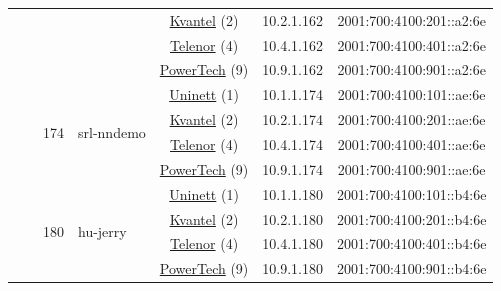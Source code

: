 \begin{small}
\begin{center}
\begin{longtable}{|c|c|c|c|c|c|c|c|}
  &  &  &  & \multicolumn{2}{|c|}{\tiny{\href{http://kvantel.no}{Kvantel} (2)}} & \tiny{10.2.1.162} & \tiny{2001:700:4100:201::a2:6e} \\* \cline{5-5}\cline{6-6}\cline{7-7}\cline{8-8}
  &  &  &  & \multicolumn{2}{|c|}{\tiny{\href{https://www.telenor.no}{Telenor} (4)}} & \tiny{10.4.1.162} & \tiny{2001:700:4100:401::a2:6e} \\* \cline{5-5}\cline{6-6}\cline{7-7}\cline{8-8}
  &  &  &  & \multicolumn{2}{|c|}{\tiny{\href{http://www.powertech.no}{PowerTech} (9)}} & \tiny{10.9.1.162} & \tiny{2001:700:4100:901::a2:6e} \\* \cline{3-3}\cline{4-4}\cline{5-5}\cline{6-6}\cline{7-7}\cline{8-8}
  &  & \multirow{4}{*}{\tiny{174}} & \multicolumn{1}{|l|}{\multirow{4}{*}{\tiny{srl-nndemo}}} & \multicolumn{2}{|c|}{\tiny{\href{https://www.uninett.no}{Uninett} (1)}} & \tiny{10.1.1.174} & \tiny{2001:700:4100:101::ae:6e} \\* \cline{5-5}\cline{6-6}\cline{7-7}\cline{8-8}
  &  &  &  & \multicolumn{2}{|c|}{\tiny{\href{http://kvantel.no}{Kvantel} (2)}} & \tiny{10.2.1.174} & \tiny{2001:700:4100:201::ae:6e} \\* \cline{5-5}\cline{6-6}\cline{7-7}\cline{8-8}
  &  &  &  & \multicolumn{2}{|c|}{\tiny{\href{https://www.telenor.no}{Telenor} (4)}} & \tiny{10.4.1.174} & \tiny{2001:700:4100:401::ae:6e} \\* \cline{5-5}\cline{6-6}\cline{7-7}\cline{8-8}
  &  &  &  & \multicolumn{2}{|c|}{\tiny{\href{http://www.powertech.no}{PowerTech} (9)}} & \tiny{10.9.1.174} & \tiny{2001:700:4100:901::ae:6e} \\* \cline{3-3}\cline{4-4}\cline{5-5}\cline{6-6}\cline{7-7}\cline{8-8}
  &  & \multirow{4}{*}{\tiny{180}} & \multicolumn{1}{|l|}{\multirow{4}{*}{\tiny{hu-jerry}}} & \multicolumn{2}{|c|}{\tiny{\href{https://www.uninett.no}{Uninett} (1)}} & \tiny{10.1.1.180} & \tiny{2001:700:4100:101::b4:6e} \\* \cline{5-5}\cline{6-6}\cline{7-7}\cline{8-8}
  &  &  &  & \multicolumn{2}{|c|}{\tiny{\href{http://kvantel.no}{Kvantel} (2)}} & \tiny{10.2.1.180} & \tiny{2001:700:4100:201::b4:6e} \\* \cline{5-5}\cline{6-6}\cline{7-7}\cline{8-8}
  &  &  &  & \multicolumn{2}{|c|}{\tiny{\href{https://www.telenor.no}{Telenor} (4)}} & \tiny{10.4.1.180} & \tiny{2001:700:4100:401::b4:6e} \\* \cline{5-5}\cline{6-6}\cline{7-7}\cline{8-8}
  &  &  &  & \multicolumn{2}{|c|}{\tiny{\href{http://www.powertech.no}{PowerTech} (9)}} & \tiny{10.9.1.180} & \tiny{2001:700:4100:901::b4:6e} \\* \cline{3-3}\cline{4-4}\cline{5-5}\cline{6-6}\cline{7-7}\cline{8-8}

\end{longtable}
\end{center}
\end{small}
